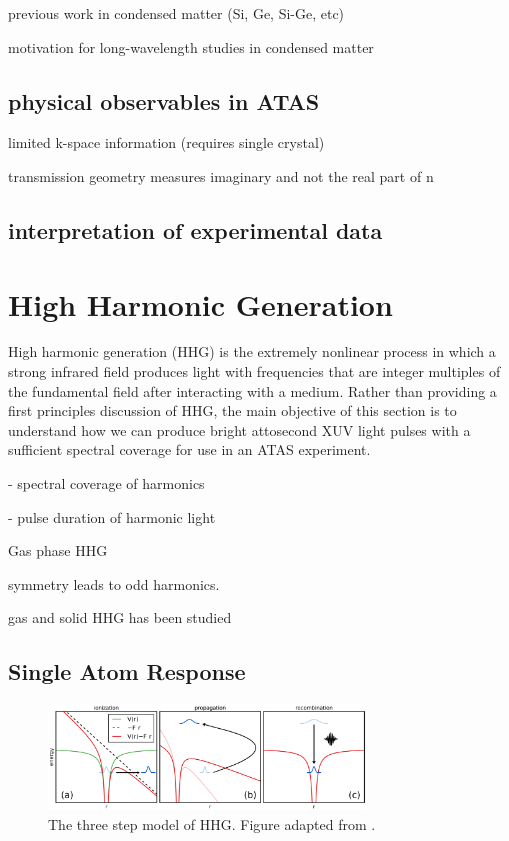previous work in condensed matter (Si, Ge, Si-Ge, etc)

motivation for long-wavelength studies in condensed matter

\subsection{physical observables in ATAS}
limited k-space information (requires single crystal)

transmission geometry measures imaginary and not the real part of n

\subsection{interpretation of experimental data}

\section{High Harmonic Generation}

High harmonic generation (HHG) is the extremely nonlinear process in which a strong infrared field produces light with frequencies that are integer multiples of the fundamental field after interacting with a medium. Rather than providing a first principles discussion of HHG, the main objective of this section is to understand how we can produce bright attosecond XUV light pulses with a sufficient spectral coverage for use in an ATAS experiment.

- spectral coverage of harmonics

- pulse duration of harmonic light

Gas phase HHG 

symmetry leads to odd harmonics.

gas and solid HHG has been studied

\subsection{Single Atom Response}

\begin{figure}
	\centering
	\includegraphics[width=0.75\textwidth]{figures/chap1/ThreeStepModel.png}
	\caption{The three step model of HHG. Figure adapted from \cite{schounAttosecondHighHarmonicSpectroscopy2015}.}
	\label{fig:ThreeStepModel}
\end{figure}

